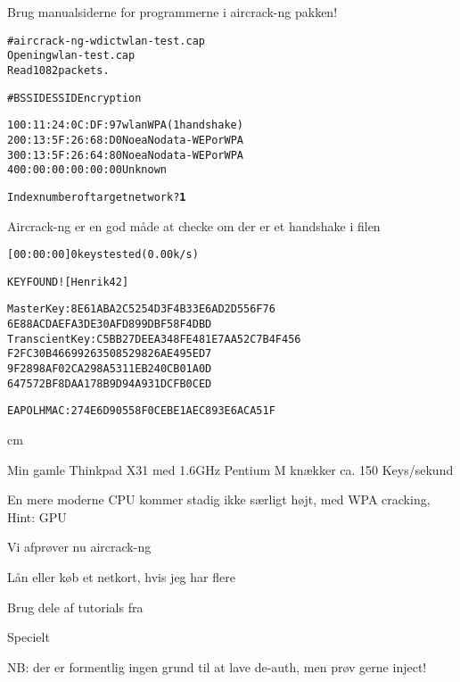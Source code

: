 \documentclass[20pt,landscape,a4paper,footrule]{foils}
\begin{document}
\centerline{Brug manualsiderne for programmerne i aircrack-ng pakken!}


\begin{alltt}
\small
# aircrack-ng -w dict wlan-test.cap
Opening wlan-test.cap
Read 1082 packets.

#  BSSID              ESSID           Encryption

1  00:11:24:0C:DF:97  wlan            WPA (1 handshake)
2  00:13:5F:26:68:D0  Noea            No data - WEP or WPA
3  00:13:5F:26:64:80  Noea            No data - WEP or WPA
4  00:00:00:00:00:00                  Unknown

Index number of target network ? {\bf 1}
\end{alltt}

Aircrack-ng er en god måde at checke om der er et handshake i filen


\begin{alltt}
\small
          [00:00:00] 0 keys tested (0.00 k/s)

                    KEY FOUND! [ Henrik42 ]

Master Key     : 8E 61 AB A2 C5 25 4D 3F 4B 33 E6 AD 2D 55 6F 76
                 6E 88 AC DA EF A3 DE 30 AF D8 99 DB F5 8F 4D BD
Transcient Key : C5 BB 27 DE EA 34 8F E4 81 E7 AA 52 C7 B4 F4 56
                 F2 FC 30 B4 66 99 26 35 08 52 98 26 AE 49 5E D7
                 9F 28 98 AF 02 CA 29 8A 53 11 EB 24 0C B0 1A 0D
                 64 75 72 BF 8D AA 17 8B 9D 94 A9 31 DC FB 0C ED

EAPOL HMAC     : 27 4E 6D 90 55 8F 0C EB E1 AE C8 93 E6 AC A5 1F

\end{alltt}

 cm

\centerline{Min gamle Thinkpad X31 med 1.6GHz Pentium M knækker ca. 150 Keys/sekund}

En mere moderne CPU kommer stadig ikke særligt højt, med WPA cracking, Hint: GPU



\begin{list1}
\item Vi afprøver nu aircrack-ng
\item Lån eller køb et netkort, hvis jeg har flere
\item Brug dele af tutorials fra\\
\item Specielt 
\item NB: der er formentlig ingen grund til at lave de-auth, men prøv gerne inject!
\end{list1}
\end{document}
